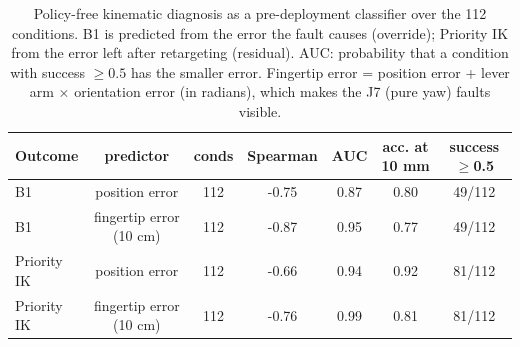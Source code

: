 \begin{table}[t]
\centering
\caption{Policy-free kinematic diagnosis as a pre-deployment classifier over the 112 conditions. B1 is predicted from the error the fault causes (override); Priority IK from the error left after retargeting (residual). AUC: probability that a condition with success $\geq 0.5$ has the smaller error. Fingertip error = position error + lever arm $\times$ orientation error (in radians), which makes the J7 (pure yaw) faults visible.}
\label{tab:diagnosis}
\setlength{\tabcolsep}{3pt}
\begin{tabular}{lcccccc}
\toprule
Outcome & predictor & conds & Spearman & AUC & acc. at 10 mm & success$\geq$0.5 \\
\midrule
B1 & position error & 112 & -0.75 & 0.87 & 0.80 & 49/112 \\
B1 & fingertip error (10 cm) & 112 & -0.87 & 0.95 & 0.77 & 49/112 \\
Priority IK & position error & 112 & -0.66 & 0.94 & 0.92 & 81/112 \\
Priority IK & fingertip error (10 cm) & 112 & -0.76 & 0.99 & 0.81 & 81/112 \\
\bottomrule
\end{tabular}
\end{table}
